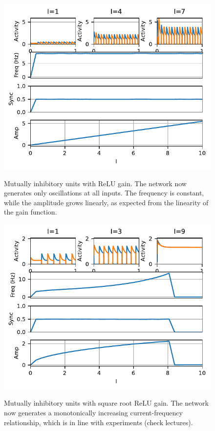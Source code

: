 \documentclass{cmc}
\begin{document}
\begin{figure}
	\centering \includegraphics[width=1\linewidth]{figures/coupled_inhibitory_units_and_max_gain}\\
	\caption{Mutually inhibitory units with ReLU gain. The network now generates only oscillations at all inputs. The frequency is constant, while the amplitude grows linearly, as expected from the linearity of the gain function.
	\label{fig:plot_coupled_max}}
\end{figure}


\begin{figure}
	\centering \includegraphics[width=1\linewidth]{figures/coupled_inhibitory_units_with_max-sqrt_gain}\\
	\caption{Mutually inhibitory units with square root ReLU gain. The network now generates a monotonically increasing current-frequency relationship, which is in line with experiments (check lectures).
	\label{fig:plot_coupled_sqrt_max}}
\end{figure}
\end{document}
